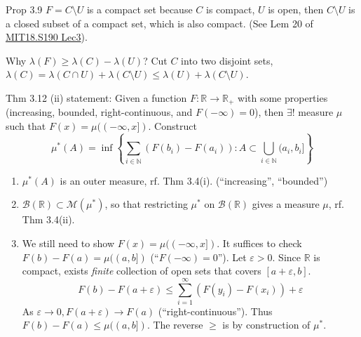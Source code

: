 \begin{note}{Prop 3.9}
    $F=C\setminus U$ is a compact set because $C$ is compact, $U$ is open, then $C\setminus U$ is a closed subset of a compact set, which is also compact. (See Lem 20 of \href{https://ocw.mit.edu/courses/18-s190-introduction-to-metric-spaces-january-iap-2023/mit18_s190iap23_lec3.pdf}{MIT18.S190 Lec3}).

    Why $\lambda(F)\ge \lambda(C)-\lambda(U)$? Cut $C$ into two disjoint sets, $\lambda(C)=\lambda(C\cap U)+\lambda(C\setminus U)\le \lambda(U)+\lambda(C\setminus U)$.
\end{note}

\begin{note}{Thm 3.12}
    (ii) statement: Given a function $F:\mathbb{R}\to\mathbb{R}_+$ with some properties (increasing, bounded, right-continuous, and $F(-\infty)=0$), then $\exists!$ measure $\mu$ such that $F(x)=\mu((-\infty,x])$. Construct 
    \[
    \mu^*(A)=\inf\left\{
    \sum_{i\in\mathbb{N}}(F(b_i)-F(a_i)): A\subset \bigcup_{i\in\mathbb{N}}(a_i,b_i]
    \right\}
    \]
    \begin{enumerate}
        \item[(Step 1)] $\mu^*(A)$ is an outer measure, rf. Thm 3.4(i). (``increasing'', ``bounded'')
        \item[(Step 2)] $\mathcal{B}(\mathbb{R})\subset \mathcal{M}(\mu^*)$, so that restricting $\mu^*$ on $\mathcal{B}(\mathbb{R})$ gives a measure $\mu$, rf. Thm 3.4(ii).
        \item[(Step 3)] We still need to show $F(x)=\mu((-\infty,x])$. It suffices to check $F(b)-F(a)=\mu((a,b])$ (``$F(-\infty)=0$''). Let $\varepsilon>0$. Since $\mathbb{R}$ is compact, exists \emph{finite} collection of open sets that covers $[a+\varepsilon,b]$. 
        \[
        F(b)-F(a+\varepsilon)\le\sum_{i=1}^{\infty}(F(y_i)-F(x_i))+\varepsilon
        \]
        As $\varepsilon\to 0, F(a+\varepsilon)\to F(a)$ (``right-continuous''). Thus $F(b)-F(a)\le \mu((a,b])$. The reverse $\ge $ is by construction of $\mu^*$.
    \end{enumerate}
\end{note}
